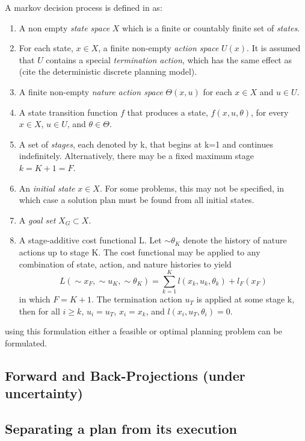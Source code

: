 A markov decision process is defined in \cite[pg.498]{Lav06} as:
\begin{enumerate}
\item A non empty \textit{state space} \(X\) which is a finite or countably
  finite set of \textit{states}.
\item For each state, \(x \in X\), a finite non-empty \textit{action space}
  \(U(x)\). It is assumed that \(U\) contains a special \textit{termination
    action}, which has the same effect as (cite the deterministic discrete
  planning model).
\item A finite non-empty \textit{nature action space} \(\Theta(x,u)\) for each
  \(x \in X\) and \(u \in U\).
\item A state transition function \(f\) that produces a state,
  \(f(x,u,\theta)\), for every \(x \in X\), \(u \in U\), and \(\theta \in
  \Theta\).
\item A set of \textit{stages}, each denoted by k, that begins at k=1 and
  continues indefinitely. Alternatively, there may be a fixed maximum stage \(k
  = K+1=F\).
\item An \textit{initial state} \(x \in X\). For some problems, this may not be
  specified, in which case a solution plan must be found from all initial
  states.

\item A \textit{goal set} \(X_G \subset X\).
\item A stage-additive cost functional L. Let \(\sim{\theta}_K\) denote the
  history of nature actions up to stage K. The cost functional may be applied to
  any combination of state, action, and nature histories to yield
  \[
    L(\sim{x}_F, \sim{u}_K, \sim{\theta}_K) = \sum_{k=1}^{K} l(x_k,u_k,\theta_k)
    + l_F(x_F)
  \]
  in which \(F = K + 1\). The termination action \(u_T\) is applied at some
  stage k, then for all \(i \geq k\), \(u_i = u_T\), \(x_i = x_k\), and
  \(l(x_i,u_T, \theta_i) = 0\).
\end{enumerate}
\cite[pg 498]{Lav06}

using this formulation either a feasible or optimal planning problem can be formulated.

\subsection{Forward and Back-Projections (under uncertainty)}

\subsection{Separating a plan from its execution}

